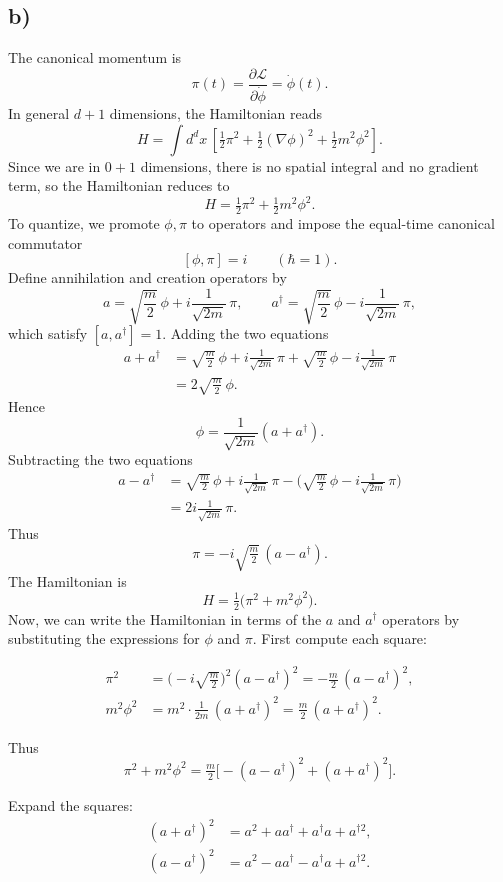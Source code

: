 \documentclass[12pt]{article}
\begin{document}
\subsection*{b)}

The canonical momentum is
\[
\pi(t)=\frac{\partial\mathcal{L}}{\partial\dot\phi}=\dot\phi(t).
\]
In general $d+1$ dimensions, the Hamiltonian reads
\[
H = \int d^dx \,\left[\tfrac{1}{2}\pi^2 + \tfrac{1}{2}(\nabla\phi)^2 + \tfrac{1}{2} m^2 \phi^2\right].
\]
Since we are in $0+1$ dimensions, there is no spatial integral and no gradient term, so the Hamiltonian reduces to
\[
H = \tfrac{1}{2}\pi^2 + \tfrac{1}{2} m^2 \phi^2.
\]
To quantize, we promote $\phi,\pi$ to operators and impose the equal-time canonical commutator
\[
[\phi,\pi]=i \qquad (\hbar=1).
\]
Define annihilation and creation operators by
\[
a=\sqrt{\frac{m}{2}}\,\phi + i\frac{1}{\sqrt{2m}}\,\pi,\qquad
a^\dagger=\sqrt{\frac{m}{2}}\,\phi - i\frac{1}{\sqrt{2m}}\,\pi,
\]
which satisfy $[a,a^\dagger]=1$. Adding the two equations
\begin{align*}
a + a^\dagger 
&= \sqrt{\tfrac{m}{2}}\,\phi + i \tfrac{1}{\sqrt{2m}}\,\pi 
+ \sqrt{\tfrac{m}{2}}\,\phi - i \tfrac{1}{\sqrt{2m}}\,\pi \\
&= 2\sqrt{\tfrac{m}{2}}\,\phi.
\end{align*}
Hence
\[
\phi = \frac{1}{\sqrt{2m}} (a + a^\dagger).
\]
Subtracting the two equations
\begin{align*}
a - a^\dagger 
&= \sqrt{\tfrac{m}{2}}\,\phi + i \tfrac{1}{\sqrt{2m}}\,\pi 
- \Big( \sqrt{\tfrac{m}{2}}\,\phi - i \tfrac{1}{\sqrt{2m}}\,\pi \Big) \\
&= 2i \tfrac{1}{\sqrt{2m}}\,\pi.
\end{align*}
Thus
\[
\pi = -i \sqrt{\tfrac{m}{2}}\,(a - a^\dagger).
\]
The Hamiltonian is
\[
H = \tfrac{1}{2}\big(\pi^2 + m^2\phi^2\big).
\]
Now, we can write the Hamiltonian in terms of the $a$ and $a^{\dagger}$
operators by substituting the expressions for \(\phi\) and \(\pi\). First
compute each square:

\begin{align*}
\pi^2
&= \big(-i\sqrt{\tfrac{m}{2}}\big)^2 (a - a^\dagger)^2
= -\tfrac{m}{2}\,(a - a^\dagger)^2, \\[6pt]
m^2\phi^2
&= m^2 \cdot \tfrac{1}{2m}\,(a + a^\dagger)^2
= \tfrac{m}{2}\,(a + a^\dagger)^2.
\end{align*}

Thus
\[
\pi^2 + m^2\phi^2 = \tfrac{m}{2}\Big[-(a - a^\dagger)^2 + (a + a^\dagger)^2\Big].
\]

Expand the squares:
\begin{align*}
(a + a^\dagger)^2 &= a^2 + a a^\dagger + a^\dagger a + a^{\dagger 2},\\
(a - a^\dagger)^2 &= a^2 - a a^\dagger - a^\dagger a + a^{\dagger 2}.
\end{align*}
\end{document}
